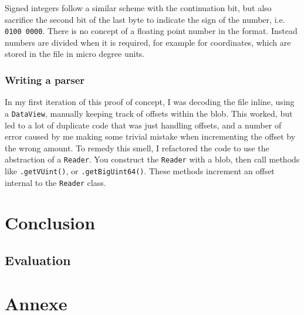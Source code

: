 \documentclass[]{final_report}
\begin{document}
Signed integers follow a similar scheme with the continuation bit, but also sacrifice the second bit of the last byte to indicate the sign of the number, i.e. \texttt{0100 0000}. There is no concept of a floating point number in the format. Instead numbers are divided when it is required, for example for coordinates, which are stored in the file in micro degree units.

\subsection{Writing a parser}

In my first iteration of this proof of concept, I was decoding the file inline, using a \texttt{DataView}, manually keeping track of offsets within the blob. This worked, but led to a lot of duplicate code that was just handling offsets, and a number of error caused by me making some trivial mistake when incrementing the offset by the wrong amount. To remedy this smell, I refactored the code to use the abstraction of a \texttt{Reader}. You construct the \texttt{Reader} with a blob, then call methods like \texttt{.getVUint()}, or \texttt{.getBigUint64()}. These methods increment an offset internal to the \texttt{Reader} class.


\chapter{Conclusion}


\section{Evaluation}

\chapter{Annexe}



\renewcommand*{\bibfont}{\normalfont\small}
\printbibliography{}
\end{document}
